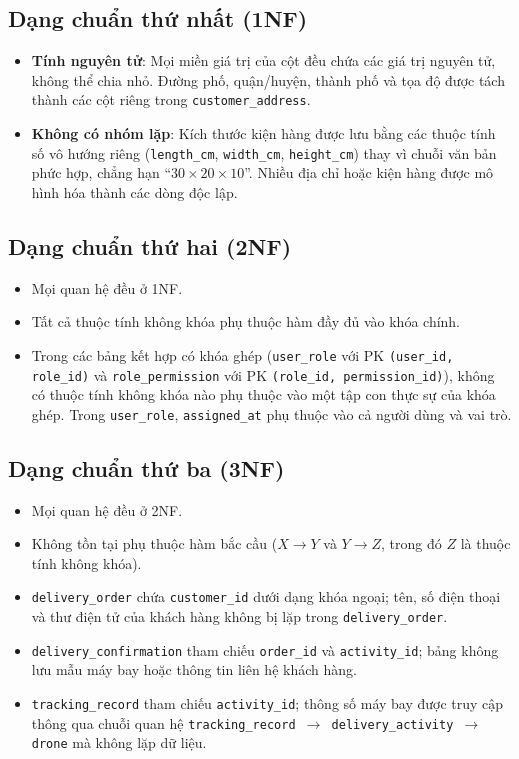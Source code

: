 \subsection{Dạng chuẩn thứ nhất (1NF)}
\begin{itemize}
    \item \textbf{Tính nguyên tử}: Mọi miền giá trị của cột đều chứa các giá trị nguyên tử, không thể chia nhỏ. Đường phố, quận/huyện, thành phố và tọa độ được tách thành các cột riêng trong \texttt{customer\_address}.
    \item \textbf{Không có nhóm lặp}: Kích thước kiện hàng được lưu bằng các thuộc tính số vô hướng riêng (\texttt{length\_cm}, \texttt{width\_cm}, \texttt{height\_cm}) thay vì chuỗi văn bản phức hợp, chẳng hạn ``$30\times 20\times 10$''. Nhiều địa chỉ hoặc kiện hàng được mô hình hóa thành các dòng độc lập.
\end{itemize}

\subsection{Dạng chuẩn thứ hai (2NF)}
\begin{itemize}
    \item Mọi quan hệ đều ở 1NF.
    \item Tất cả thuộc tính không khóa phụ thuộc hàm đầy đủ vào khóa chính.
    \item Trong các bảng kết hợp có khóa ghép (\texttt{user\_role} với PK \texttt{(user\_id, role\_id)} và \texttt{role\_permission} với PK \texttt{(role\_id, permission\_id)}), không có thuộc tính không khóa nào phụ thuộc vào một tập con thực sự của khóa ghép. Trong \texttt{user\_role}, \texttt{assigned\_at} phụ thuộc vào cả người dùng và vai trò.
\end{itemize}

\subsection{Dạng chuẩn thứ ba (3NF)}
\begin{itemize}
    \item Mọi quan hệ đều ở 2NF.
    \item Không tồn tại phụ thuộc hàm bắc cầu ($X \to Y$ và $Y \to Z$, trong đó $Z$ là thuộc tính không khóa).
    \item \texttt{delivery\_order} chứa \texttt{customer\_id} dưới dạng khóa ngoại; tên, số điện thoại và thư điện tử của khách hàng không bị lặp trong \texttt{delivery\_order}.
    \item \texttt{delivery\_confirmation} tham chiếu \texttt{order\_id} và \texttt{activity\_id}; bảng không lưu mẫu máy bay hoặc thông tin liên hệ khách hàng.
    \item \texttt{tracking\_record} tham chiếu \texttt{activity\_id}; thông số máy bay được truy cập thông qua chuỗi quan hệ \texttt{tracking\_record $\to$ delivery\_activity $\to$ drone} mà không lặp dữ liệu.
\end{itemize}

